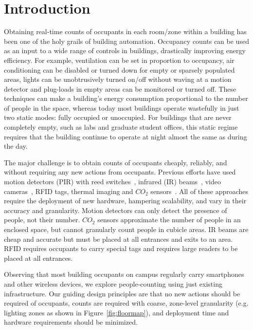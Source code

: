 \section{Introduction}

Obtaining real-time counts of occupants in each room/zone within a building has been one of the holy grails of building automation. Occupancy counts can be used as an input to a wide range of controls in buildings, drastically improving energy efficiency. For example,  ventilation can be set in proportion to occupancy, air conditioning can be disabled or turned down for empty or sparsely populated areas, lights can be unobtrusively turned on/off without waving at a motion detector and plug-loads in empty areas can be monitored or turned off. These techniques can make a building's energy consumption proportional to the number of people in the space, whereas today most buildings operate wastefully in just two static modes: fully occupied or unoccupied. For buildings that are never completely empty, such as labs and graduate student offices, this static regime requires that the building continue to operate at night almost the same as during the day.

The major challenge is to obtain counts of occupants cheaply, reliably, and without requiring any new actions from occupants. Previous efforts have used motion detectors (PIR) with reed switches~\cite{Agarwal2010, Lu2010}, infrared (IR) beams~\cite{sun9}, video cameras~\cite{Erickson11}, RFID tags, thermal imaging and $CO_2$ sensors~\cite{Sand04}. All of these approaches require the deployment of new hardware, hampering scalability, and vary in their accuracy and granularity. Motion detectors can only detect the presence of people, not their number. $CO_2$ sensors approximate the number of people in an enclosed space, but cannot granularly count people in cubicle areas. IR beams are cheap and accurate but must be placed at all entrances and exits to an area. RFID requires occupants to carry special tags and requires large readers to be placed at all entrances. 

Observing that most building occupants on campus regularly carry smartphones and other wireless devices, we explore people-counting using just existing infrastructure. Our guiding design principles are that no new actions should be required of occupants, counts are required with coarse, zone-level granularity (e.g. lighting zones as shown in Figure~\ref{fig:floormap}), and deployment time and hardware requirements should be minimized.

